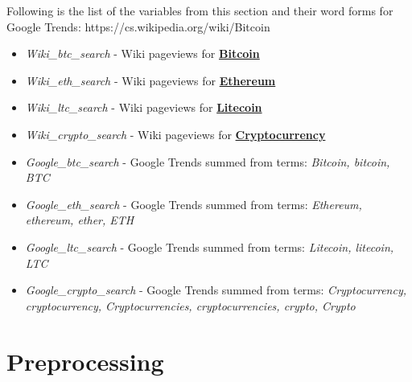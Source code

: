 Following is the list of the variables from this section and their word forms
for Google Trends:
https://cs.wikipedia.org/wiki/Bitcoin
\begin{itemize}
    \item \textit{Wiki\_btc\_search} - Wiki pageviews for \textbf{\href{https://cs.wikipedia.org/wiki/Bitcoin}{Bitcoin}}
    \item \textit{Wiki\_eth\_search} - Wiki pageviews for \textbf{\href{https://cs.wikipedia.org/wiki/Ethereum}{Ethereum}}
    \item \textit{Wiki\_ltc\_search} - Wiki pageviews for \textbf{\href{https://cs.wikipedia.org/wiki/Litecoin}{Litecoin}}
    \item \textit{Wiki\_crypto\_search} - Wiki pageviews for \textbf{\href{https://en.wikipedia.org/wiki/Cryptocurrency}{Cryptocurrency}}
    \item \textit{Google\_btc\_search} - Google Trends summed from terms: \textit{Bitcoin, bitcoin, BTC}
    \item \textit{Google\_eth\_search} - Google Trends summed from terms: \textit{Ethereum, ethereum, ether, ETH}
    \item \textit{Google\_ltc\_search} - Google Trends summed from terms: \textit{Litecoin, litecoin, LTC}
    \item \textit{Google\_crypto\_search} - Google Trends summed from terms: \textit{Cryptocurrency, cryptocurrency, Cryptocurrencies, cryptocurrencies, crypto, Crypto}
\end{itemize}


\section{Preprocessing}


